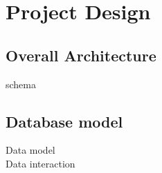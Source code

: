 \chapter{Project Design} %

\section{Overall Architecture}

schema

\section{Database model}

Data model \\
Data interaction
